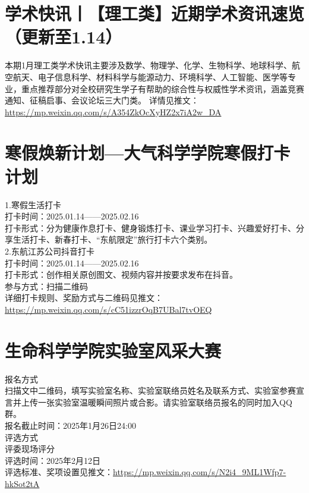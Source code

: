 \documentclass[letterpaper, 12pt]{article}
\begin{document}
\begin{multicols}{2}
\section{学术快讯丨【理工类】近期学术资讯速览（更新至1.14）}
本期1月理工类学术快讯主要涉及数学、物理学、化学、生物科学、地球科学、航空航天、电子信息科学、材料科学与能源动力、环境科学、人工智能、医学等专业，重点推荐部分对全校研究生学子有帮助的综合性与权威性学术资讯，涵盖竞赛通知、征稿启事、会议论坛三大门类。
详情见推文：\url{https://mp.weixin.qq.com/s/A354ZkOcXyHZ2x7iA2w_DA}
\section{寒假焕新计划---大气科学学院寒假打卡计划}
1.寒假生活打卡\\
打卡时间：2025.01.14——2025.02.16\\
打卡形式：分为健康作息打卡、健身锻炼打卡、课业学习打卡、兴趣爱好打卡、分享生活打卡、新春打卡、“东航限定”旅行打卡六个类别。\\
2.东航江苏公司抖音打卡\\
打卡时间：2025.01.14——2025.02.16\\
打卡形式：创作相关原创图文、视频内容并按要求发布在抖音。\\
参与方式：扫描二维码\\
详细打卡规则、奖励方式与二维码见推文：\url{https://mp.weixin.qq.com/s/cC51izzrOqB7UBal7tvOEQ}\\


\section{生命科学学院实验室风采大赛}
报名方式\\
扫描文中二维码，填写实验室名称、实验室联络员姓名及联系方式、实验室参赛宣言并上传一张实验室温暖瞬间照片或合影。请实验室联络员报名的同时加入QQ群。\\
报名截止时间：2025年1月26日24:00\\
评选方式\\
评委现场评分\\
评选时间：2025年2月12日\\
评选标准、奖项设置见推文：\url{https://mp.weixin.qq.com/s/N2i4_9ML1Wfp7-hkSot2tA}\\

\end{multicols} 
\end{document}
